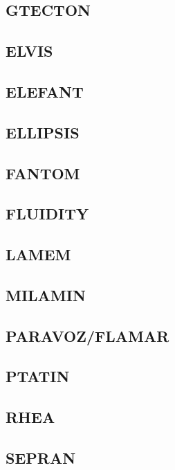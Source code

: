 \documentclass[a4paper]{article}
\begin{document}
\subsection{GTECTON}

\subsection{ELVIS}

\subsection{ELEFANT}

\subsection{ELLIPSIS}

\subsection{FANTOM}

\subsection{FLUIDITY}

\subsection{LAMEM}

\subsection{MILAMIN}

\subsection{PARAVOZ/FLAMAR}

\subsection{PTATIN}

\subsection{RHEA}

\subsection{SEPRAN}
\end{document}
